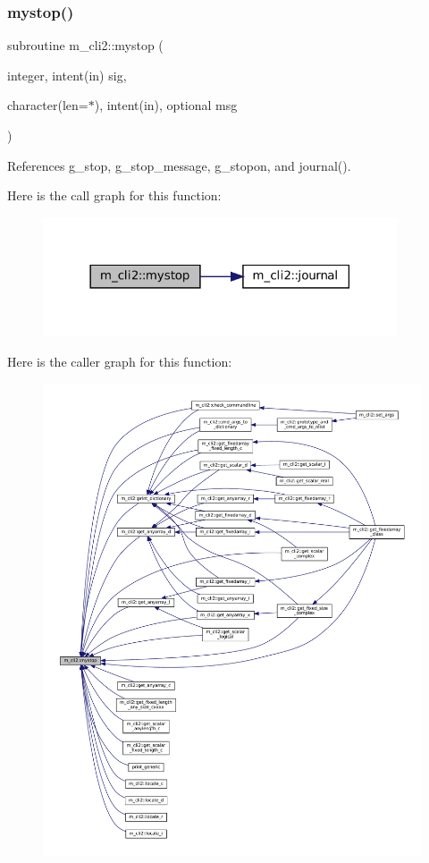 \subsubsection{\texorpdfstring{mystop()}{mystop()}}
{\footnotesize\ttfamily subroutine m\+\_\+cli2\+::mystop (\begin{DoxyParamCaption}\item[{integer, intent(in)}]{sig,  }\item[{character(len=$\ast$), intent(in), optional}]{msg }\end{DoxyParamCaption})\hspace{0.3cm}{\ttfamily [private]}}



References g\+\_\+stop, g\+\_\+stop\+\_\+message, g\+\_\+stopon, and journal().

Here is the call graph for this function\+:
\nopagebreak
\begin{figure}[H]
\begin{center}
\leavevmode
\includegraphics[width=297pt]{namespacem__cli2_a0e44d7c9058545df8bf09674e9c2e799_cgraph}
\end{center}
\end{figure}
Here is the caller graph for this function\+:
\nopagebreak
\begin{figure}[H]
\begin{center}
\leavevmode
\includegraphics[width=350pt]{namespacem__cli2_a0e44d7c9058545df8bf09674e9c2e799_icgraph}
\end{center}
\end{figure}
